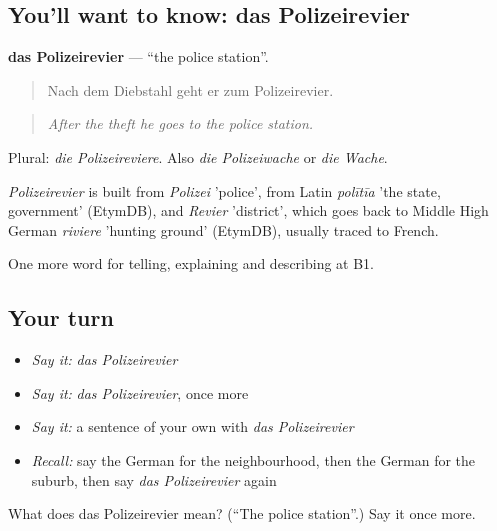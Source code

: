 \subsection*{You'll want to know: das Polizeirevier}
\textbf{das Polizeirevier} — \textquotedblleft{}the police station\textquotedblright{}.

\begin{quote}
Nach dem Diebstahl geht er zum Polizeirevier.
\end{quote}

\begin{quote}
\emph{After the theft he goes to the police station.}
\end{quote}

Plural: \emph{die Polizeireviere}. Also \emph{die Polizeiwache} or \emph{die Wache}.

\begin{cousinweb}
\emph{Polizeirevier} is built from \emph{Polizei} 'police', from Latin \emph{polītīa} 'the state, government' (EtymDB), and \emph{Revier} 'district', which goes back to Middle High German \emph{riviere} 'hunting ground' (EtymDB), usually traced to French.
\end{cousinweb}

\begin{grammarlens}[title={What you've built}]
One more word for telling, explaining and describing at B1.
\end{grammarlens}

\subsection*{Your turn}
\begin{itemize}
\raggedright
  \item \emph{Say it:} \emph{das Polizeirevier}
  \item \emph{Say it:} \emph{das Polizeirevier}, once more
  \item \emph{Say it:} a sentence of your own with \emph{das Polizeirevier}
  \item \emph{Recall:} say the German for the neighbourhood, then the German for the suburb, then say \emph{das Polizeirevier} again
\end{itemize}

\begin{tcolorbox}[breakable,colback=teal!4,colframe=teal!35!black,title={Before you move on}]
What does das Polizeirevier mean? (\textquotedblleft{}The police station\textquotedblright{}.) Say it once more.
\end{tcolorbox}
